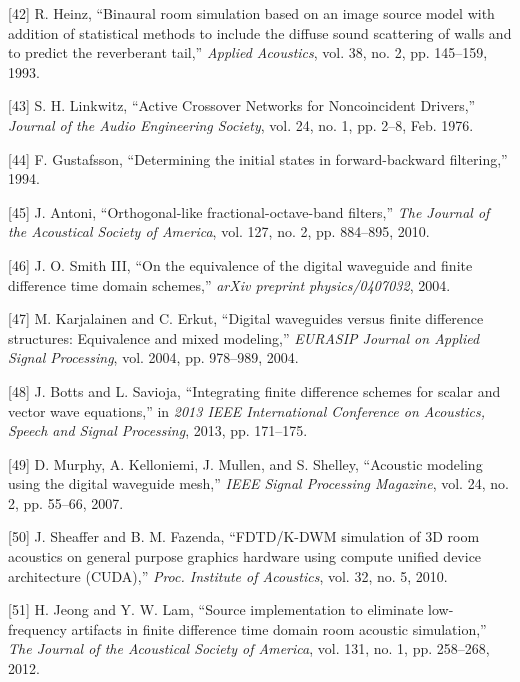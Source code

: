 \documentclass[]{scrreprt}
\begin{document}
\hypertarget{ref-heinzux5fbinauralux5f1993}{}
{[}42{]} R. Heinz, ``Binaural room simulation based on an image source
model with addition of statistical methods to include the diffuse sound
scattering of walls and to predict the reverberant tail,'' \emph{Applied
Acoustics}, vol. 38, no. 2, pp. 145--159, 1993.

\hypertarget{ref-linkwitzux5factiveux5f1976}{}
{[}43{]} S. H. Linkwitz, ``Active Crossover Networks for Noncoincident
Drivers,'' \emph{Journal of the Audio Engineering Society}, vol. 24, no.
1, pp. 2--8, Feb. 1976.

\hypertarget{ref-gustafssonux5fdeterminingux5f1994}{}
{[}44{]} F. Gustafsson, ``Determining the initial states in
forward-backward filtering,'' 1994.

\hypertarget{ref-antoniux5forthogonal-likeux5f2010}{}
{[}45{]} J. Antoni, ``Orthogonal-like fractional-octave-band filters,''
\emph{The Journal of the Acoustical Society of America}, vol. 127, no.
2, pp. 884--895, 2010.

\hypertarget{ref-smithux5fiiiux5fequivalenceux5f2004}{}
{[}46{]} J. O. Smith III, ``On the equivalence of the digital waveguide
and finite difference time domain schemes,'' \emph{arXiv preprint
physics/0407032}, 2004.

\hypertarget{ref-karjalainenux5fdigitalux5f2004}{}
{[}47{]} M. Karjalainen and C. Erkut, ``Digital waveguides versus finite
difference structures: Equivalence and mixed modeling,'' \emph{EURASIP
Journal on Applied Signal Processing}, vol. 2004, pp. 978--989, 2004.

\hypertarget{ref-bottsux5fintegratingux5f2013}{}
{[}48{]} J. Botts and L. Savioja, ``Integrating finite difference
schemes for scalar and vector wave equations,'' in \emph{2013 IEEE
International Conference on Acoustics, Speech and Signal Processing},
2013, pp. 171--175.

\hypertarget{ref-murphyux5facousticux5f2007}{}
{[}49{]} D. Murphy, A. Kelloniemi, J. Mullen, and S. Shelley, ``Acoustic
modeling using the digital waveguide mesh,'' \emph{IEEE Signal
Processing Magazine}, vol. 24, no. 2, pp. 55--66, 2007.

\hypertarget{ref-sheafferux5ffdtdux2fk-dwmux5f2010}{}
{[}50{]} J. Sheaffer and B. M. Fazenda, ``FDTD/K-DWM simulation of 3D
room acoustics on general purpose graphics hardware using compute
unified device architecture (CUDA),'' \emph{Proc. Institute of
Acoustics}, vol. 32, no. 5, 2010.

\hypertarget{ref-jeongux5fsourceux5f2012}{}
{[}51{]} H. Jeong and Y. W. Lam, ``Source implementation to eliminate
low-frequency artifacts in finite difference time domain room acoustic
simulation,'' \emph{The Journal of the Acoustical Society of America},
vol. 131, no. 1, pp. 258--268, 2012.
\end{document}
